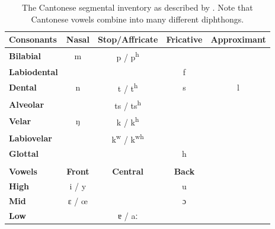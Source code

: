 \begin{table}[htbp]
    \caption{The Cantonese segmental inventory as described by \citet{matthews_2013_cantonese}. Note that Cantonese vowels combine into many different diphthongs.}
    \label{ch3:tab:cantoneseinventory}
    \centering
    \begin{tabular}{lcccc}
    \toprule
    \textbf{Consonants}  & \textbf{Nasal} & \textbf{Stop/Affricate} & \textbf{Fricative} & \textbf{Approximant} \\
    \midrule
    \textbf{Bilabial}    & {\ipafont m}   & {\ipafont p / p\textsuperscript{h}}          &               &                 \\
    \textbf{Labiodental} &                &                                              & {\ipafont f}  &                 \\
    \textbf{Dental}      & {\ipafont n}   & {\ipafont t / t\textsuperscript{h}}          & {\ipafont s}  & {\ipafont l}    \\
    \textbf{Alveolar}    &                & {\ipafont ts / ts\textsuperscript{h}}        &               &                 \\
    \textbf{Velar}       & {\ipafont ŋ}   & {\ipafont k / k\textsuperscript{h}}          &               &                 \\
    \textbf{Labiovelar}  &                & {\ipafont k\textsuperscript{w} / k\textsuperscript{wh}} &    &                 \\
    \textbf{Glottal}     &                &                                              & {\ipafont h } &                 \\
                         &                &                                              &               &                 \\
    \midrule
    \textbf{Vowels}      & \textbf{Front} & \textbf{Central}    & \textbf{Back}  & \\
    \midrule 
    \textbf{High}        & {\ipafont i / y} &                   & {\ipafont u } & \\
    \textbf{Mid}         & {\ipafont ɛ / œ} &                   & {\ipafont ɔ } & \\
    \textbf{Low}         &                  & {\ipafont ɐ / aː} &               & \\
    \bottomrule
    \end{tabular}
\end{table}
    
